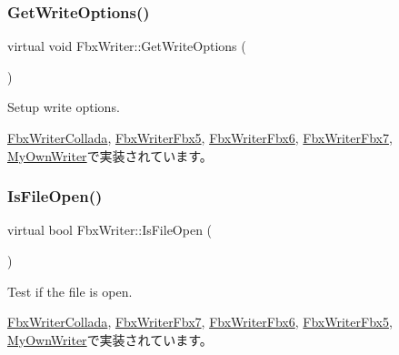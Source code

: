 \mbox{\label{class_fbx_writer_ad237f5cd183ae29f744aee32b7aa5525}} 
\subsubsection{\texorpdfstring{Get\+Write\+Options()}{GetWriteOptions()}}
{\footnotesize\ttfamily virtual void Fbx\+Writer\+::\+Get\+Write\+Options (\begin{DoxyParamCaption}{ }\end{DoxyParamCaption})\hspace{0.3cm}{\ttfamily [pure virtual]}}

Setup write options. 

\hyperlink{class_fbx_writer_collada_a64fdc18e00335c37acf279a5ef0d3711}{Fbx\+Writer\+Collada}, \hyperlink{class_fbx_writer_fbx5_ad86d4ec0c944e5c552286fdcbd7ff86d}{Fbx\+Writer\+Fbx5}, \hyperlink{class_fbx_writer_fbx6_a62f398d8ed2746ea076481d920f481e4}{Fbx\+Writer\+Fbx6}, \hyperlink{class_fbx_writer_fbx7_a881561770b711a6419b45fbe81e4ee94}{Fbx\+Writer\+Fbx7}, \hyperlink{class_my_own_writer_a2e3d99525964397118372f3f685e9dde}{My\+Own\+Writer}で実装されています。

\mbox{\label{class_fbx_writer_ab70be3aaebd304af11cdce5e225cce68}} 
\subsubsection{\texorpdfstring{Is\+File\+Open()}{IsFileOpen()}}
{\footnotesize\ttfamily virtual bool Fbx\+Writer\+::\+Is\+File\+Open (\begin{DoxyParamCaption}{ }\end{DoxyParamCaption})\hspace{0.3cm}{\ttfamily [pure virtual]}}

Test if the file is open. 

\hyperlink{class_fbx_writer_collada_a77c117aa61d57faf57e6810823938cbd}{Fbx\+Writer\+Collada}, \hyperlink{class_fbx_writer_fbx7_ad9f82dc72129c63eda20dcccda7db53b}{Fbx\+Writer\+Fbx7}, \hyperlink{class_fbx_writer_fbx6_ada26031c01e10e3f54431739e9286d64}{Fbx\+Writer\+Fbx6}, \hyperlink{class_fbx_writer_fbx5_abe979bfdd626bd8b222a8385e6529a47}{Fbx\+Writer\+Fbx5}, \hyperlink{class_my_own_writer_a09f75dc6a30ecdb00927253a7f69eae8}{My\+Own\+Writer}で実装されています。

